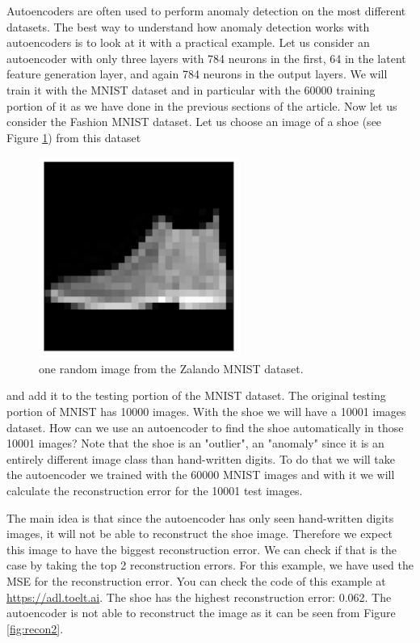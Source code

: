 \documentclass[12pt,a4]{article}
\begin{document}
Autoencoders are often used to perform anomaly detection on the most different datasets. The best way to understand how anomaly detection works with autoencoders is to look at it with a practical example. Let us consider an autoencoder with only three layers with 784 neurons in the first, 64 in the latent feature generation layer, and again 784 neurons in the output layers. We will train it with the MNIST dataset and in particular with the 60000 training portion of it as we have done in the previous sections of the article. Now let us consider the Fashion MNIST dataset. Let us choose an image of a shoe (see Figure \ref{fig:anom1}) from this dataset
\begin{figure}[hbt]
\centering
\includegraphics[width=6.58cm,height=6.56cm]{./images/image11.png}
\caption{one random image from the Zalando MNIST dataset.}\label{fig:anom1}
\end{figure}
and add it to the testing portion of the MNIST dataset. The original testing portion of MNIST has 10000 images. With the shoe we will have a 10001 images dataset. How can we use an autoencoder to find the shoe automatically in those 10001 images? Note that the shoe is an "outlier", an "anomaly" since it is an entirely different image class than hand-written digits. To do that we will take the autoencoder we trained with the 60000 MNIST images and with it we will calculate the reconstruction error for the 10001 test images.


The main idea is that since the autoencoder has only seen hand-written digits images, it will not be able to reconstruct the shoe image. Therefore we expect this image to have the biggest reconstruction error. We can check if that is the case by taking the top 2 reconstruction errors. For this example, we have used the MSE for the reconstruction error. You can check the code of this example at \url{https://adl.toelt.ai}. The shoe has the highest reconstruction error: 0.062. The autoencoder is not able to reconstruct the image as it can be seen from Figure \ref{fig:recon2}.
\end{document}
